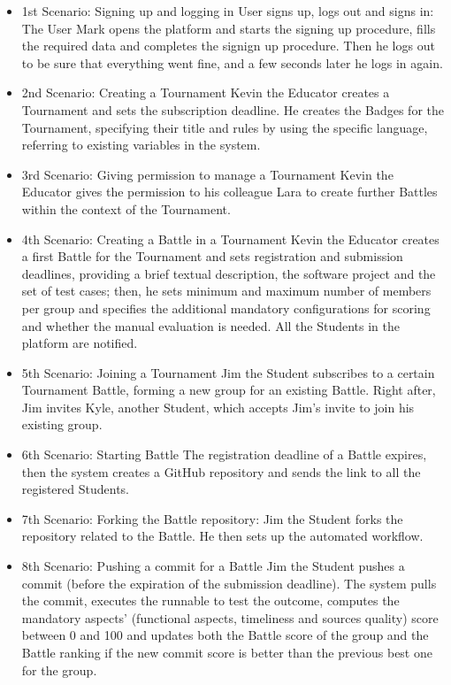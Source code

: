 \documentclass{Configuration_Files/Template}
\begin{document}
\begin{itemize}
\item \textcolor{bluepoli}{1st Scenario: Signing up and logging in} User signs up, logs out and signs in: The User Mark opens the platform and starts the signing up procedure, fills the required data and completes the signign up procedure. Then he logs out to be sure that everything went fine, and a few seconds later he logs in again.
\item \textcolor{bluepoli}{2nd Scenario: Creating a Tournament} Kevin the Educator creates a Tournament and sets the subscription deadline. He creates the Badges for the Tournament, specifying their title and rules by using the specific language, referring to existing variables in the system.
\item \textcolor{bluepoli}{3rd Scenario: Giving permission to manage a Tournament} Kevin the Educator gives the permission to his colleague Lara to create further Battles within the context of the Tournament.
\item \textcolor{bluepoli}{4th Scenario: Creating a Battle in a Tournament} Kevin the Educator creates a first Battle for the Tournament and sets registration and submission deadlines, providing a brief textual description, the software project and the set of test cases; then, he sets minimum and maximum number of members per group and specifies the additional mandatory configurations for scoring and whether the manual evaluation is needed. All the Students in the platform are notified. 
\item \textcolor{bluepoli}{5th Scenario: Joining a Tournament} Jim the Student subscribes to a certain Tournament Battle, forming a new group for an existing Battle. Right after, Jim invites Kyle, another Student, which accepts Jim’s invite to join his existing group.
\item \textcolor{bluepoli}{6th Scenario: Starting Battle} The registration deadline of a Battle expires, then the system creates a GitHub repository and sends the link to all the registered Students.
\item \textcolor{bluepoli}{7th Scenario: Forking the Battle repository}: Jim the Student forks the repository related to the Battle. He then sets up the automated workflow.
\item \textcolor{bluepoli}{8th Scenario: Pushing a commit for a Battle} Jim the Student pushes a commit (before the expiration of the submission deadline). The system pulls the commit, executes the runnable to test the outcome, computes the mandatory aspects’ (functional aspects, timeliness and sources quality) score between 0 and 100 and updates both the Battle score of the group and the Battle ranking if the new commit score is better than the previous best one for the group.

\end{itemize}
\end{document}
